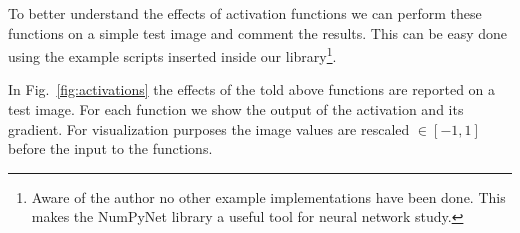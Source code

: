 \documentclass{standalone}
\begin{document}
To better understand the effects of activation functions we can perform these functions on a simple test image and comment the results.
This can be easy done using the example scripts inserted inside our library\footnote{
  Aware of the author no other example implementations have been done.
  This makes the NumPyNet library a useful tool for neural network study.
}.

In Fig.~\ref{fig:activations} the effects of the told above functions are reported on a test image.
For each function we show the output of the activation and its gradient.
For visualization purposes the image values are rescaled $\in[-1, 1]$ before the input to the functions.






\end{document}
